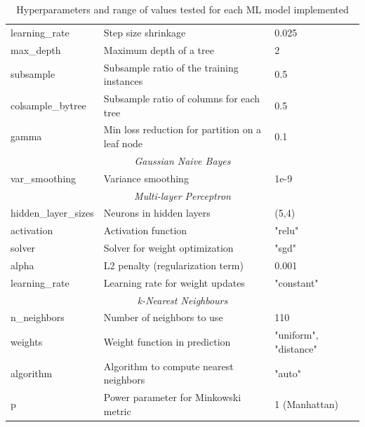 \begin{table}[h]
\begin{adjustbox}{center}
\begin{tabular}{|l|l|l|}
			learning\_rate & Step size shrinkage & 0.025 \\
			max\_depth & Maximum depth of a tree & 2 \\
			subsample & Subsample ratio of the training instances & 0.5 \\
			colsample\_bytree & Subsample ratio of columns for each tree & 0.5 \\
			gamma & Min loss reduction for partition on a leaf node & 0.1 \\
			\hline
			\multicolumn{3}{|c|}{\rule{0pt}{2.5ex}\textit{Gaussian Naive Bayes}} \\
			\hline
			var\_smoothing & Variance smoothing & 1e-9 \\
			\hline
			\multicolumn{3}{|c|}{\rule{0pt}{2.5ex}\textit{Multi-layer Perceptron}} \\
			\hline
			hidden\_layer\_sizes & Neurons in hidden layers & (5,4) \\
			activation & Activation function & "relu" \\
			solver & Solver for weight optimization & "sgd" \\
			alpha & L2 penalty (regularization term) & 0.001 \\
			learning\_rate & Learning rate for weight updates & "constant" \\
			\hline
			\multicolumn{3}{|c|}{\rule{0pt}{2.5ex}\textit{k-Nearest Neighbours}} \\
			\hline
			n\_neighbors & Number of neighbors to use & 110 \\
			weights & Weight function in prediction & "uniform", "distance" \\
			algorithm & Algorithm to compute nearest neighbors & "auto" \\
			p & Power parameter for Minkowski metric & 1 (Manhattan) \\
			\hline
		\end{tabular}
	\end{adjustbox}
	
	\caption{Hyperparameters and range of values tested for each ML model implemented}
	\label{table:hyperparameters2}
\end{table}


